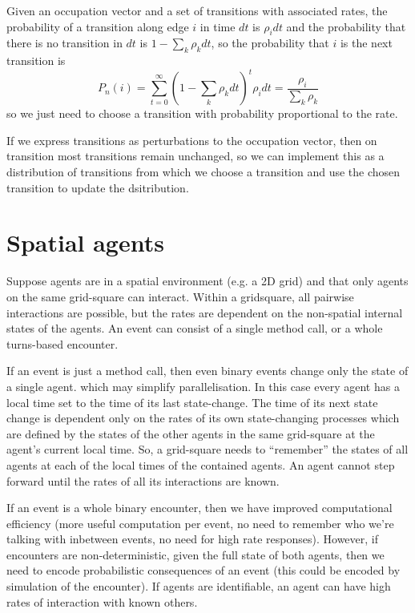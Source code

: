\documentclass[a4paper]{article}
\begin{document}
Given an occupation vector and a set of transitions with associated rates, the probability of a transition along edge $i$ in time $dt$ is $\rho_i dt$ and the probability that there is no transition in $dt$ is $1-\sum_k \rho_k dt$, so the probability that $i$ is the next transition is
\[
P_n(i) = \sum_{t=0}^\infty (1-\sum_k \rho_k dt)^t \rho_i dt = \frac{\rho_i}{\sum_k \rho_k}
\]
so we just need to choose a transition with probability proportional to the rate.

If we express transitions as perturbations to the occupation vector, then on transition most transitions remain unchanged, so we can implement this as a distribution of transitions from which we choose a transition and use the chosen transition to update the dsitribution.

\section{Spatial agents}

Suppose agents are in a spatial environment (e.g. a 2D grid) and that only agents on the same grid-square can interact. Within a gridsquare, all pairwise interactions are possible, but the rates are dependent on the non-spatial internal states of the agents. An event can consist of a single method call, or a whole turns-based encounter.

If an event is just a method call, then even binary events change only the state of a single agent. which may simplify parallelisation. In this case every agent has a local time set to the time of its last state-change. The time of its next state change is dependent only on the rates of its own state-changing processes which are defined by the states of the other agents in the same grid-square at the agent's current local time. So, a grid-square needs to ``remember'' the states of all agents at each of the local times of the contained agents. An agent cannot step forward until the rates of all its interactions are known.

If an event is a whole binary encounter, then we have improved computational efficiency (more useful computation per event, no need to remember who we're talking with inbetween events, no need for high rate responses). However, if encounters are non-deterministic, given the full state of both agents, then we need to encode probabilistic consequences of an event (this could be encoded by simulation of the encounter). If agents are identifiable, an agent can have high rates of interaction with known others.
\end{document}

